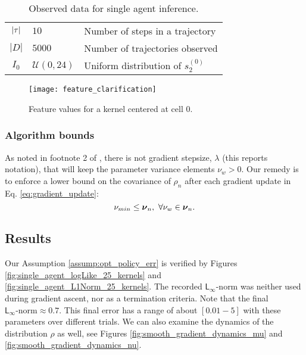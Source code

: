     \begin{table}[H]
        \centering
        \begin{tabular}{c|l l}
                $|\tau|$ & $10$ & Number of steps in a trajectory \\
                $|D|$ & $5000$ & Number of trajectories observed \\
                $I_0$ & $\mathcal{U}(0,24)$ & Uniform distribution of $s_2^{(0)}$ \\
        \end{tabular}
        \caption{Observed data for single agent inference.}
        \label{table:single_agent_data_set}
\end{table}

    \begin{figure}[h]
        \texttt{[image: feature\_clarification]}
        \caption{Feature values for a kernel centered at cell $0$.}
        \label{fig:kernel_visualization}
    \end{figure}

\subsubsection{Algorithm bounds}

    As noted in footnote 2 of \cite{williams1992simple}, there is not gradient stepsize, $\lambda$ (this reports
    notation), that will keep the parameter variance elements $\nu_w >0$. Our remedy is to enforce a lower bound on the
    covariance of $\rho_n$ after each gradient update in Eq. \ref{eq:gradient_update}:
    \begin{equation}\label{eq:param_var_bounds}
    \nu_{min} \leq \boldsymbol{\mathbb{\nu}}_n,\ \forall \nu_w \in \boldsymbol{\mathbb{\nu}}_n.
    \end{equation}

\subsection{Results}\label{sec:single_agent_25K_results}
    Our Assumption \ref{assump:opt_policy_err} is verified by Figures \ref{fig:single_agent_logLike_25_kernels} and
    \ref{fig:single_agent_L1Norm_25_kernels}. The recorded $\mathsf{L}_{\infty}$-norm was neither used during gradient
    ascent, nor as a termination criteria. Note that the final $\mathsf{L}_\infty\text{-norm} \approx 0.7$. This final
    error has a range of about $[0.01-5]$ with these parameters over different trials.  We can also examine the dynamics
    of the distribution $\rho$ as well, see Figures \ref{fig:smooth_gradient_dynamics_mu} and
    \ref{fig:smooth_gradient_dynamics_nu}.

